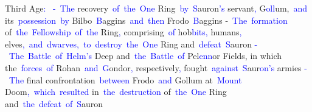 \documentclass{article}
\begin{document}
\begin{tcolorbox}[colframe=black,colback=white]
{}Third Age\textcolor{blue}{:}\textcolor{blue}{~
}\textcolor{blue}{-}\textcolor{blue}{~The} recovery\textcolor{blue}{~of}\textcolor{blue}{~the}\textcolor{blue}{~One} Ring\textcolor{blue}{~by}\textcolor{blue}{~S}auron\textcolor{blue}{'s} servant\textcolor{blue}{,} G\textcolor{blue}{oll}um,\textcolor{blue}{~and} its\textcolor{blue}{~possession}\textcolor{blue}{~by} Bilbo\textcolor{blue}{~B}aggins\textcolor{blue}{~and}\textcolor{blue}{~then} Frodo\textcolor{blue}{~B}aggins\textcolor{blue}{
}-\textcolor{blue}{~The}\textcolor{blue}{~formation} of\textcolor{blue}{~the}\textcolor{blue}{~Fellowship}\textcolor{blue}{~of}\textcolor{blue}{~the} Ring\textcolor{blue}{,} comprising\textcolor{blue}{~of} hob\textcolor{blue}{bits}\textcolor{blue}{,} humans\textcolor{blue}{,} elves\textcolor{blue}{,}\textcolor{blue}{~and}\textcolor{blue}{~dwar}\textcolor{blue}{ves}\textcolor{blue}{,}\textcolor{blue}{~to}\textcolor{blue}{~destroy}\textcolor{blue}{~the}\textcolor{blue}{~One} Ring and\textcolor{blue}{~defeat}\textcolor{blue}{~S}auron\textcolor{blue}{
}\textcolor{blue}{-}\textcolor{blue}{~The}\textcolor{blue}{~Battle}\textcolor{blue}{~of}\textcolor{blue}{~Helm}\textcolor{blue}{'s} Deep and\textcolor{blue}{~the}\textcolor{blue}{~Battle}\textcolor{blue}{~of} Pel\textcolor{blue}{enn}or Fields, in which the\textcolor{blue}{~forces}\textcolor{blue}{~of} Rohan\textcolor{blue}{~and}\textcolor{blue}{~G}ondor\textcolor{blue}{,} respectively\textcolor{blue}{,} fought\textcolor{blue}{~against}\textcolor{blue}{~S}aur\textcolor{blue}{on}\textcolor{blue}{'s} armies\textcolor{blue}{
}\textcolor{blue}{-}\textcolor{blue}{~The} final confrontation\textcolor{blue}{~between} Frodo\textcolor{blue}{~and} Gollum at\textcolor{blue}{~Mount} Doom\textcolor{blue}{,}\textcolor{blue}{~which}\textcolor{blue}{~resulted} in\textcolor{blue}{~the}\textcolor{blue}{~destruction} of\textcolor{blue}{~the}\textcolor{blue}{~One} Ring and\textcolor{blue}{~the}\textcolor{blue}{~defeat}\textcolor{blue}{~of}\textcolor{blue}{~S}auron\textcolor{blue}{

}
\end{tcolorbox}
\end{document}

